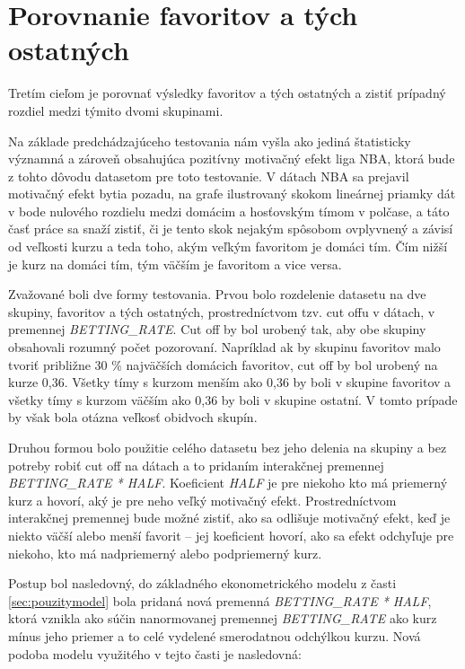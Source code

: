 \documentclass[
  digital, %
  oneside, %
  notable,   %
  lof,     %
  lot,     %
]{fithesis3}
\begin{document}
	\section{Porovnanie favoritov a tých ostatných}
	Tretím cieľom je porovnať výsledky favoritov a tých ostatných a zistiť prípadný rozdiel medzi týmito dvomi skupinami.

	Na základe predchádzajúceho testovania nám vyšla ako jediná štatisticky významná a zároveň obsahujúca pozitívny motivačný efekt liga NBA, ktorá bude z tohto dôvodu datasetom pre toto testovanie. V dátach NBA sa prejavil motivačný efekt bytia pozadu, na grafe ilustrovaný skokom lineárnej priamky dát v bode nulového rozdielu medzi domácim a hosťovským tímom v polčase, a táto časť práce sa snaží zistiť, či je tento skok nejakým spôsobom ovplyvnený a závisí od veľkosti kurzu a teda toho, akým veľkým favoritom je domáci tím. Čím nižší je kurz na domáci tím, tým väčším je favoritom a vice versa. 

	Zvažované boli dve formy testovania. Prvou bolo rozdelenie datasetu na dve skupiny, favoritov a tých ostatných, prostredníctvom tzv. cut offu v dátach, v premennej \textit{BETTING\_RATE}. Cut off by bol urobený tak, aby obe skupiny obsahovali rozumný počet pozorovaní. Napríklad ak by skupinu favoritov malo tvoriť približne 30 \% najväčších domácich favoritov, cut off by bol urobený na kurze 0,36. Všetky tímy s kurzom menším ako 0,36 by boli v skupine favoritov a všetky tímy s kurzom väčším ako 0,36 by boli v skupine ostatní. V tomto prípade by však bola otázna veľkosť obidvoch skupín.

	Druhou formou bolo použitie celého datasetu bez jeho delenia na skupiny a bez potreby robiť cut off na dátach a to pridaním interakčnej premennej \textit{BETTING\_RATE * HALF}. Koeficient \textit{HALF} je pre niekoho kto má priemerný kurz a hovorí, aký je pre neho veľký motivačný efekt. Prostredníctvom interakčnej premennej bude možné zistiť, ako sa odlišuje motivačný efekt, keď je niekto väčší alebo menší favorit – jej koeficient hovorí, ako sa efekt odchyľuje pre niekoho, kto má nadpriemerný alebo podpriemerný kurz. 
	
	Postup bol nasledovný, do základného ekonometrického modelu z časti \ref{sec:pouzitymodel} bola pridaná nová premenná \textit{BETTING\_RATE * HALF}, ktorá vznikla ako súčin nanormovanej premennej \textit{BETTING\_RATE} ako kurz mínus jeho priemer a to celé vydelené smerodatnou odchýlkou kurzu.  Nová podoba modelu využitého v tejto časti je nasledovná:
	
\end{document}
